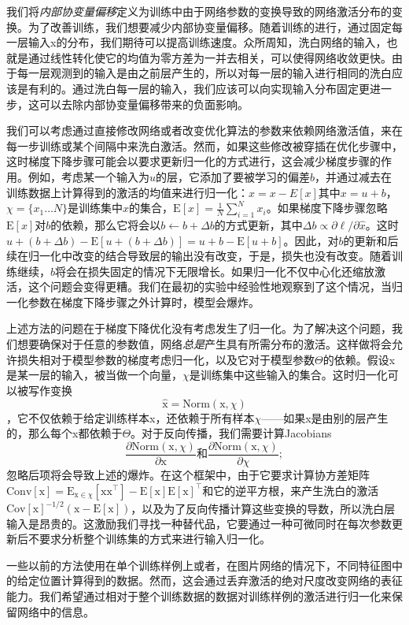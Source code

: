 \documentclass[../main.tex]{subfile}
\begin{document}
我们将\textit{内部协变量偏移}定义为训练中由于网络参数的变换导致的网络激活分布的变换。为了改善训练，我们想要减少内部协变量偏移。随着训练的进行，通过固定每一层输入x的分布，我们期待可以提高训练速度。众所周知，洗白网络的输入，也就是通过线性转化使它的均值为零方差为一并去相关，可以使得网络收敛更快。由于每一层观测到的输入是由之前层产生的，所以对每一层的输入进行相同的洗白应该是有利的。通过洗白每一层的输入，我们应该可以向实现输入分布固定更进一步，这可以去除内部协变量偏移带来的负面影响。

我们可以考虑通过直接修改网络或者改变优化算法的参数来依赖网络激活值，来在每一步训练或某个间隔中来洗白激活。然而，如果这些修改被穿插在优化步骤中，这时梯度下降步骤可能会以要求更新归一化的方式进行，这会减少梯度步骤的作用。例如，考虑某一个输入为$u$的层，它添加了要被学习的偏差$b$，并通过减去在训练数据上计算得到的激活的均值来进行归一化：$\hat{x} = x - E\left[x\right]$其中$x=u+b$，$\chi = \{x_1\ldots N\}$是训练集中$x$的集合，$\text{E}\left[x\right]=\frac{1}{N}\sum_{i=1}^{N}x_i$。如果梯度下降步骤忽略$\text{E}\left[x\right]$对$b$的依赖，那么它将会以$b \leftarrow b + \Delta b$的方式更新，其中$\Delta b \propto \partial \ell / \partial \hat{x}$。这时$u + \left( b + \Delta b \right) - \text{E}\left[ u + \left(b + \Delta b\right) \right] = u + b - \text{E}\left[ u+b \right]$。因此，对$b$的更新和后续在归一化中改变的结合导致层的输出没有改变，于是，损失也没有改变。随着训练继续，$b$将会在损失固定的情况下无限增长。如果归一化不仅中心化还缩放激活，这个问题会变得更糟。我们在最初的实验中经验性地观察到了这个情况，当归一化参数在梯度下降步骤之外计算时，模型会爆炸。

上述方法的问题在于梯度下降优化没有考虑发生了归一化。为了解决这个问题，我们想要确保对于任意的参数值，网络\textit{总是}产生具有所需分布的激活。这样做将会允许损失相对于模型参数的梯度考虑归一化，以及它对于模型参数$\Theta$的依赖。假设x是某一层的输入，被当做一个向量，$\chi$是训练集中这些输入的集合。这时归一化可以被写作变换
\begin{equation*}
    \hat{\text{x}} = \text{Norm}\left( \text{x}, \chi \right)
\end{equation*}
，它不仅依赖于给定训练样本x，还依赖于所有样本$\chi$——如果x是由别的层产生的，那么每个x都依赖于$\Theta$。对于反向传播，我们需要计算Jacobians
\begin{equation*}
    \frac{\partial \text{Norm}\left( \text{x}, \chi \right)}{\partial \text{x}} \text{和}  \frac{\partial \text{Norm}\left( \text{x}, \chi \right)}{\partial \chi};
\end{equation*}
忽略后项将会导致上述的爆炸。在这个框架中，由于它要求计算协方差矩阵$\text{Conv}\left[\text{x}\right] = \text{E}_{\text{x}\in \chi}\left[ \text{xx}^\top \right] - \text{E}\left[ \text{x} \right] \text{E}\left[ \text{x} \right]^\top$和它的逆平方根，来产生洗白的激活$\text{Cov}\left[ \text{x} \right]^{-1/2} \left( \text{x} - \text{E}\left[ \text{x} \right] \right)$，以及为了反向传播计算这些变换的导数，所以洗白层输入是昂贵的。这激励我们寻找一种替代品，它要通过一种可微同时在每次参数更新后不要求分析整个训练集的方式来进行输入归一化。

一些以前的方法使用在单个训练样例上或者，在图片网络的情况下，不同特征图中的给定位置计算得到的数据。然而，这会通过丢弃激活的绝对尺度改变网络的表征能力。我们希望通过相对于整个训练数据的数据对训练样例的激活进行归一化来保留网络中的信息。
\end{document}
